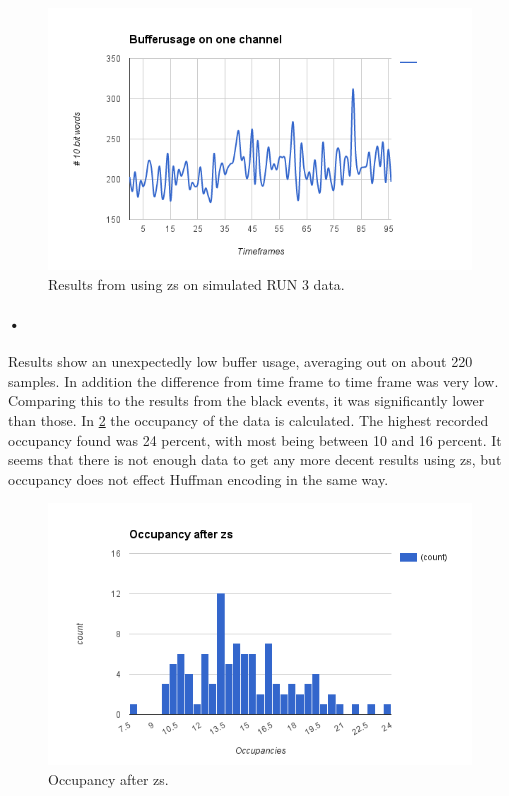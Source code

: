 \documentclass[a4paper, 12pt]{report}
\begin{document}
\begin{figure}[h!]
	\centering
		\includegraphics[width=1.0\textwidth]{images/bufferuse-one-channel-fake-pileup.png}
		\caption{Results from using \gls{zs} on simulated RUN 3 data.}
		\label{fig:synthetic-zs}
\end{figure}

\paragraph{•}
Results show an unexpectedly low buffer usage, averaging out on about 220 samples.
In addition the difference from time frame to time frame was very low.
Comparing this to the results from the black events, it was significantly lower than those.
In \ref{fig:occ-synt-zs} the occupancy of the data is calculated.
The highest recorded occupancy found was 24 percent, with most being between 10 and 16 percent.
It seems that there is not enough data to get any more decent results using \gls{zs}, but occupancy does not effect Huffman encoding in the same way.

\begin{figure}[h!]
	\centering
		\includegraphics[width=1.0\textwidth]{images/occ-after-zs.png}
		\caption{Occupancy after \gls{zs}.}
		\label{fig:occ-synt-zs}
\end{figure}
\end{document}
